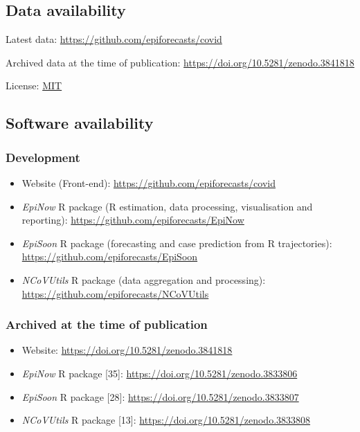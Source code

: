\documentclass[]{article}
\providecommand{\tightlist}{%
  \setlength{\itemsep}{0pt}\setlength{\parskip}{0pt}}
\begin{document}
\hypertarget{data-availability}{%
\subsection{Data availability}\label{data-availability}}

Latest data: \url{https://github.com/epiforecasts/covid}

Archived data at the time of publication:
\url{https://doi.org/10.5281/zenodo.3841818}

License: \href{https://opensource.org/licenses/MIT}{MIT}

\hypertarget{software-availability}{%
\subsection{Software availability}\label{software-availability}}

\hypertarget{development}{%
\subsubsection{Development}\label{development}}

\begin{itemize}
\tightlist
\item
  Website (Front-end): \url{https://github.com/epiforecasts/covid}
\item
  \emph{EpiNow} R package (R estimation, data processing, visualisation
  and reporting): \url{https://github.com/epiforecasts/EpiNow}
\item
  \emph{EpiSoon} R package (forecasting and case prediction from R
  trajectories): \url{https://github.com/epiforecasts/EpiSoon}
\item
  \emph{NCoVUtils} R package (data aggregation and processing):
  \url{https://github.com/epiforecasts/NCoVUtils}
\end{itemize}

\hypertarget{archived-at-the-time-of-publication}{%
\subsubsection{Archived at the time of
publication}\label{archived-at-the-time-of-publication}}

\begin{itemize}
\tightlist
\item
  Website: \url{https://doi.org/10.5281/zenodo.3841818}
\item
  \emph{EpiNow} R package {[}35{]}:
  \url{https://doi.org/10.5281/zenodo.3833806}
\item
  \emph{EpiSoon} R package {[}28{]}:
  \url{https://doi.org/10.5281/zenodo.3833807}
\item
  \emph{NCoVUtils} R package {[}13{]}:
  \url{https://doi.org/10.5281/zenodo.3833808}
\end{itemize}
\end{document}
